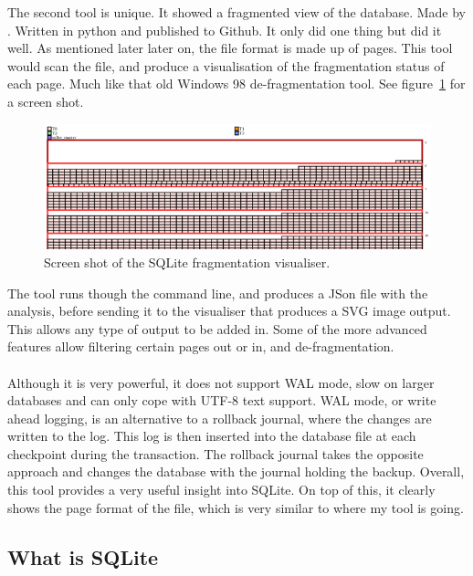 The second tool is unique. It showed a fragmented view of the database. Made by \cite{sqlitefrag}. Written in python and published to Github. It only did one thing but did it well. As mentioned later later on, the file format is made up of pages. This tool would scan the file, and produce a visualisation of the fragmentation status of each page. Much like that old Windows 98 de-fragmentation tool. See figure~\ref{fig:db_visualizer} for a screen shot.

\begin{figure}[H]
	\centering
	\includegraphics[scale=0.85]{images/db_visualizer.png}
	\caption{Screen shot of the SQLite fragmentation visualiser. \citep{sqlitefrag}}
	\label{fig:db_visualizer}
\end{figure}

The tool runs though the command line, and produces a JSon file with the analysis, before sending it to the visualiser that produces a SVG image output. This allows any type of output to be added in. Some of the more advanced features allow filtering certain pages out or in, and de-fragmentation. 
\\\\
Although it is very powerful, it does not support WAL mode, slow on larger databases and can only cope with UTF-8 text support. WAL mode, or write ahead logging, is an alternative to a rollback journal, where the changes are written to the log. This log is then inserted into the database file at each checkpoint during the transaction. The rollback journal takes the opposite approach and changes the database with the journal holding the backup. Overall, this tool provides a very useful insight into SQLite. On top of this, it clearly shows the page format of the file, which is very similar to where my tool is going.

\subsection{What is SQLite}
\label{subsec:what_is_sqlite}

